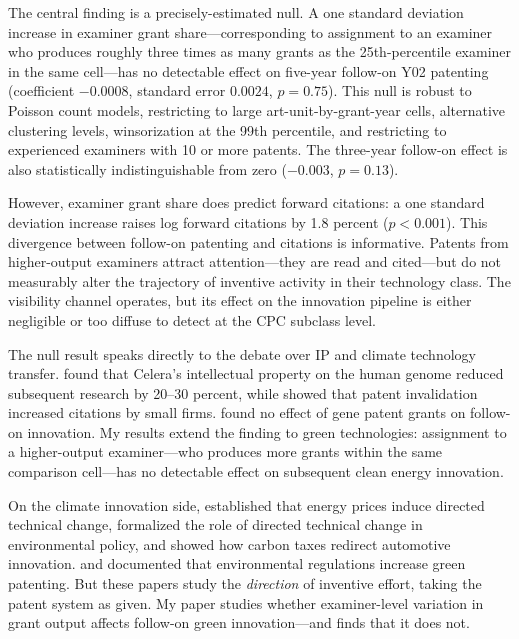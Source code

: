 \documentclass[12pt]{article}
\begin{document}
The central finding is a precisely-estimated null. A one standard deviation increase in examiner grant share---corresponding to assignment to an examiner who produces roughly three times as many grants as the 25th-percentile examiner in the same cell---has no detectable effect on five-year follow-on Y02 patenting (coefficient $-0.0008$, standard error $0.0024$, $p = 0.75$). This null is robust to Poisson count models, restricting to large art-unit-by-grant-year cells, alternative clustering levels, winsorization at the 99th percentile, and restricting to experienced examiners with 10 or more patents. The three-year follow-on effect is also statistically indistinguishable from zero ($-0.003$, $p = 0.13$).

However, examiner grant share does predict forward citations: a one standard deviation increase raises log forward citations by 1.8 percent ($p < 0.001$). This divergence between follow-on patenting and citations is informative. Patents from higher-output examiners attract attention---they are read and cited---but do not measurably alter the trajectory of inventive activity in their technology class. The visibility channel operates, but its effect on the innovation pipeline is either negligible or too diffuse to detect at the CPC subclass level.

The null result speaks directly to the debate over IP and climate technology transfer. \citet{williams2013} found that Celera's intellectual property on the human genome reduced subsequent research by 20--30 percent, while \citet{galasso2015} showed that patent invalidation increased citations by small firms. \citet{sampat2019} found no effect of gene patent grants on follow-on innovation. My results extend the \citet{sampat2019} finding to green technologies: assignment to a higher-output examiner---who produces more grants within the same comparison cell---has no detectable effect on subsequent clean energy innovation.

On the climate innovation side, \citet{popp2002} established that energy prices induce directed technical change, \citet{acemoglu2012} formalized the role of directed technical change in environmental policy, and \citet{aghion2016} showed how carbon taxes redirect automotive innovation. \citet{johnstone2010} and \citet{calel2020} documented that environmental regulations increase green patenting. But these papers study the \emph{direction} of inventive effort, taking the patent system as given. My paper studies whether examiner-level variation in grant output affects follow-on green innovation---and finds that it does not.
\end{document}
